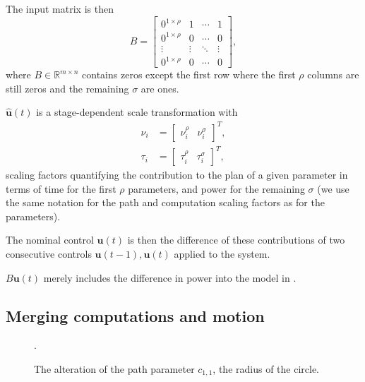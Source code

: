 The input matrix is then
\begin{equation}\label{eq:mat_B}
  B=\begin{bmatrix} 
    0^{1\times\rho} & 1      & \cdots & 1      \\
    0^{1\times\rho} & 0      & \cdots & 0      \\ 
    \vdots          & \vdots & \ddots & \vdots \\
    0^{1\times\rho} & 0      & \cdots & 0      \end{bmatrix},
\end{equation}
where $B\in\mathbb{R}^{m\times n}$ contains zeros except the first row where the first $\rho$ columns are still zeros and the remaining $\sigma$ are ones. 

$\hat{\mathbf{u}}(t)$ is a stage-dependent scale transformation with 
\begin{subequations}\label{eq:scaling}\begin{align}
\nu_i&=\begin{bmatrix}\nu_i^\rho & \nu_i^\sigma\end{bmatrix}^T,\\ 
\tau_i&=\begin{bmatrix}\tau_i^\rho & \tau_i^\sigma\end{bmatrix}^T,
\end{align}\end{subequations}
scaling factors quantifying the contribution to the plan of a given parameter in terms of time for the first $\rho$ parameters, and power for the remaining $\sigma$ (we use the same notation for the path and computation scaling factors as for the parameters). 

The nominal control $\mathbf{u}(t)$ is then the difference of these contributions of two consecutive controls $\mathbf{u}(t-1),\mathbf{u}(t)$ applied to the system. 

$B\mathbf{u}(t)$ merely includes the difference in power into the model in .



\subsection{Merging computations and motion}
\label{cp:model:periodic:merging}

\begin{figure}[h]
  \centering
  
  \caption[Path of a UAV flying a given stage]{.}
  \label{fig:tee1}
\end{figure}
\begin{figure}[h]
  \centering
  
  \caption[Alteration of the path parameter]{The alteration of the path parameter $c_{1,1}$, the radius of the circle.}
  \label{fig:tee1}
\end{figure}

